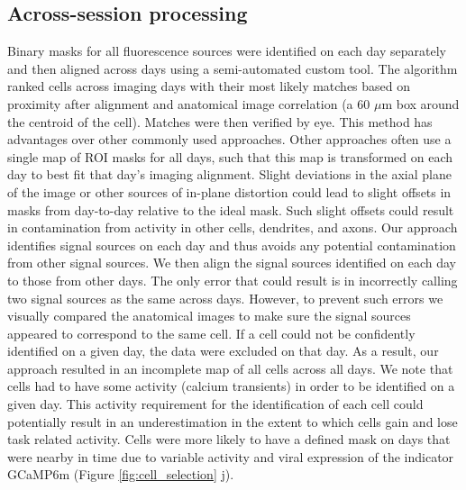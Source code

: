  \subsection{Across-session processing}\label{methods:across days}
Binary masks for all fluorescence sources were identified on each day separately and then aligned across days using a semi-automated custom tool. The algorithm ranked cells across imaging days with their most likely matches based on proximity after alignment and anatomical image correlation (a 60 $\mu$m box around the centroid of the cell). Matches were then verified by eye. This method has advantages over other commonly used approaches. Other approaches often use a single map of ROI masks for all days, such that this map is transformed on each day to best fit that day's imaging alignment. Slight deviations in the axial plane of the image or other sources of in-plane distortion could lead to slight offsets in masks from day-to-day relative to the ideal mask. Such slight offsets could result in contamination from activity in other cells, dendrites, and axons. Our approach identifies signal sources on each day and thus avoids any potential contamination from other signal sources. We then align the signal sources identified on each day to those from other days. The only error that could result is in incorrectly calling two signal sources as the same across days. However, to prevent such errors we visually compared the anatomical images to make sure the signal sources appeared to correspond to the same cell. If a cell could not be confidently identified on a given day, the data were excluded on that day. As a result, our approach resulted in an incomplete map of all cells across all days. We note that cells had to have some activity (calcium transients) in order to be identified on a given day. This activity requirement for the identification of each cell could potentially result in an underestimation in the extent to which cells gain and lose task related activity. Cells were more likely to have a defined mask on days that were nearby in time due to variable activity and viral expression of the indicator GCaMP6m (Figure \ref{fig:cell_selection} j). 

